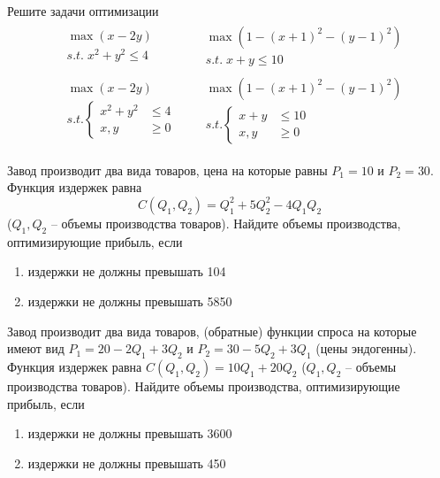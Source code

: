 \begin{exercise}
Решите задачи оптимизации
\begin{align*}
	& \begin{gathered}
		\max (x-2y) \\ s.t.\; x^2+y^2\leq 4
	\end{gathered} &
	& \begin{gathered}
		\max(1-(x+1)^2-(y-1)^2) \\ s.t.\; x+y\leq 10
	\end{gathered} \\
	& \begin{gathered}
		\max (x-2y) \\ s.t.\left\{\begin{aligned}
			 x^2+y^2&\leq 4 \\  x,y&\geq0
		\end{aligned}\right.
	\end{gathered} &
	& \begin{gathered}
		\max(1-(x+1)^2-(y-1)^2) \\ s.t.\left\{\begin{aligned}
			x+y&\leq 10  \\  x,y&\geq0
		\end{aligned}\right.
	\end{gathered}
\end{align*}
\end{exercise}

\begin{exercise}
Завод производит два вида товаров, цена на которые равны 
$P_1=10$ и $P_2=30$. Функция издержек равна
\[
	C(Q_1,Q_2)=Q_1^2+5Q_2^2-4Q_1Q_2
\]
($Q_1, Q_2$ -- объемы производства товаров). Найдите объемы производства,
оптимизирующие прибыль, если 
\begin{enumerate}
	\item издержки не должны превышать 104
	\item издержки не должны превышать 5850
\end{enumerate}
\end{exercise}

\begin{exercise}
Завод производит два вида товаров, (обратные) функции спроса на которые
имеют вид $P_1=20-2Q_1+3Q_2$ и $P_2=30-5Q_2+3Q_1$ (цены эндогенны). Функция
издержек равна $C(Q_1,Q_2)=10Q_1+20Q_2$
($Q_1, Q_2$ -- объемы производства товаров).  Найдите объемы производства,
оптимизирующие прибыль, если 
\begin{enumerate}
	\item издержки не должны превышать 3600
	\item издержки не должны превышать 450
\end{enumerate}
\end{exercise}

